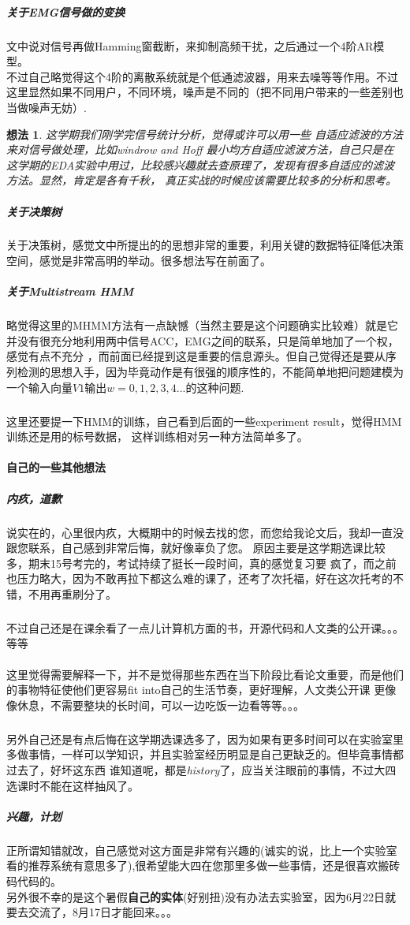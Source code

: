 \documentclass[10pt,a4paper]{article}
\newtheorem{thought}{想法}
\begin{document}
\subparagraph{关于EMG信号做的变换}
文中说对信号再做Hamming窗截断，来抑制高频干扰，之后通过一个4阶AR模型。\\ 不过自己略觉得这个4阶的离散系统就是个低通滤波器，用来去噪等等作用。不过这里显然如果不同用户，不同环境，噪声是不同的（把不同用户带来的一些差别也当做噪声无妨）.
\begin{thought}
这学期我们刚学完信号统计分析，觉得或许可以用一些
自适应滤波的方法来对信号做处理，比如windrow and Hoff 最小均方自适应滤波方法，自己只是在这学期的EDA实验中用过，比较感兴趣就去查原理了，发现有很多自适应的滤波方法。显然，肯定是各有千秋，
真正实战的时候应该需要比较多的分析和思考。
\end{thought}


\subparagraph{关于决策树}
关于决策树，感觉文中所提出的的思想非常的重要，利用关键的数据特征降低决策空间，感觉是非常高明的举动。很多想法写在前面了。

\subparagraph{关于\emph{Multistream HMM}}
略觉得这里的MHMM方法有一点缺憾（当然主要是这个问题确实比较难）就是它并没有很充分地利用两中信号ACC，EMG之间的联系，只是简单地加了一个权，感觉有点不充分
，而前面已经提到这是重要的信息源头。但自己觉得还是要从序列检测的思想入手，因为毕竟动作是有很强的顺序性的，不能简单地把问题建模为一个输入向量$V1$输出$w=0,1,2,3,4...$的这种问题.

\subparagraph{}
这里还要提一下HMM的训练，自己看到后面的一些experiment result，觉得HMM训练还是用的标号数据，
这样训练相对另一种方法简单多了。


\paragraph{自己的一些其他想法}
\subparagraph{内疚，道歉}
说实在的，心里很内疚，大概期中的时候去找的您，而您给我论文后，我却一直没跟您联系，自己感到非常后悔，就好像辜负了您。
原因主要是这学期选课比较多，期末15号考完的，考试持续了挺长一段时间，真的感觉复习要
疯了，而之前也压力略大，因为不敢再拉下都这么难的课了，还考了次托福，好在这次托考的不错，不用再重刷分了。 
\subparagraph{}
不过自己还是在课余看了一点儿计算机方面的书，开源代码和人文类的公开课。。。等等 \\\\
这里觉得需要解释一下，并不是觉得那些东西在当下阶段比看论文重要，而是他们的事物特征使他们更容易fit into自己的生活节奏，更好理解，人文类公开课
更像像休息，不需要整块的长时间，可以一边吃饭一边看等等。。。 
\subparagraph{}
另外自己还是有点后悔在这学期选课选多了，因为如果有更多时间可以在实验室里多做事情，一样可以学知识，并且实验室经历明显是自己更缺乏的。但毕竟事情都过去了，好坏这东西
谁知道呢，都是\emph{history}了，应当关注眼前的事情，不过大四选课时不能在这样抽风了。\\
\subparagraph{兴趣，计划}
正所谓知错就改，自己感觉对这方面是非常有兴趣的(诚实的说，比上一个实验室看的推荐系统有意思多了),很希望能大四在您那里多做一些事情，还是很喜欢搬砖码代码的。\\
另外很不幸的是这个暑假\textbf{自己的实体}(好别扭)没有办法去实验室，因为6月22日就要去交流了，8月17日才能回来。。。
\end{document}
